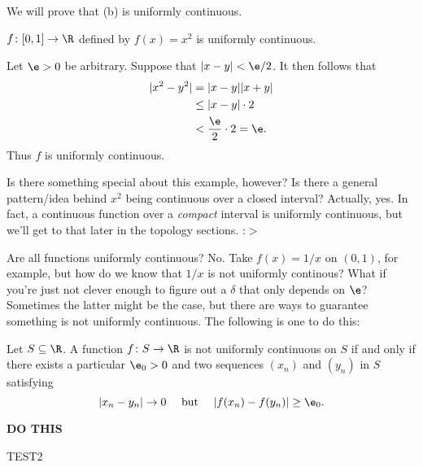 \documentclass[class=article, crop=false]{standalone}
\begin{document}
We will prove that (b) is uniformly continuous.
\begin{ex}
    $f \colon [0,1] \to \R$ defined by $f(x)=x^2$ is uniformly continuous.
\end{ex}
\begin{pf}
    Let $\e > 0$ be arbitrary. Suppose that $|x-y| < \e/2$. It then follows that
        \begin{align*}
            |x^2-y^2| &= |x-y| |x+y | \\
                &\leq |x-y| \cdot 2 \\
                &< \frac{\e}{2} \cdot 2 = \e.
        \end{align*}
    Thus $f$ is uniformly continuous.
\end{pf}
Is there something special about this example, however? Is there a general pattern/idea behind $x^2$ being continuous over a closed interval? Actually, yes. In fact, a continuous function over a \textit{compact} interval is uniformly continuous, but we'll get to that later in the topology sections. :$>$

Are all functions uniformly continuous? No. Take $f(x) = 1/x$ on $(0,1)$, for example, but how do we know that $1/x$ is not uniformly continous? What if you're just not clever enough to figure out a $\delta$ that only depends on $\e$? Sometimes the latter might be the case, but there are ways to guarantee something is not uniformly continuous. The following is one to do this:
\begin{thm}
    Let $S \subseteq \R$. A function $f \colon S \to \R$ is not uniformly continuous on $S$ if and only if there exists a particular $\e_0 > 0$ and two sequences $(x_n)$ and $(y_n)$ in $S$ satisfying
        \[
            |x_n-y_n| \to 0 \quad \text{ but } \quad |f(x_n)-f(y_n)| \geq \e_0.
        \]
\end{thm}
\begin{pf}
    \textbf{DO THIS}
\end{pf}


TEST2
\end{document}
